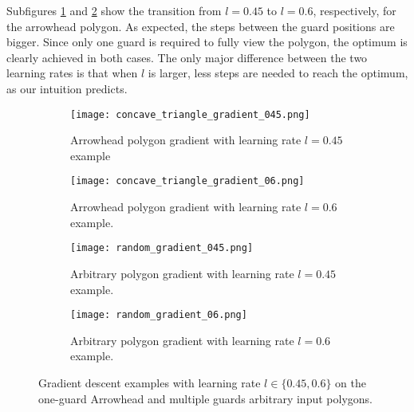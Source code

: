 Subfigures \ref{fig:concave_gradient_045} and \ref{fig:concave_gradient_06} show the transition from $l = 0.45$ to $l = 0.6$, respectively, for the arrowhead polygon. As expected, the steps between the guard positions are bigger. Since only one guard is required to fully view the polygon, the optimum is clearly achieved in both cases. The only major difference between the two learning rates is that when $l$ is larger, less steps are needed to reach the optimum, as our intuition predicts.

\begin{figure}[h!]
    \centering
    \begin{subfigure}{0.45\textwidth}
        \centering
        \texttt{[image: concave\_triangle\_gradient\_045.png]}
        \caption{Arrowhead polygon gradient with learning rate $l = 0.45$ example}
        \label{fig:concave_gradient_045}
    \end{subfigure}
    \begin{subfigure}{0.45\textwidth}
        \centering
        \texttt{[image: concave\_triangle\_gradient\_06.png]}
        \caption{Arrowhead polygon gradient with learning rate $l = 0.6$ example.}
        \label{fig:concave_gradient_06}
    \end{subfigure}
    \begin{subfigure}{0.45\textwidth}
        \centering
        \texttt{[image: random\_gradient\_045.png]}
        \caption{Arbitrary polygon gradient with learning rate $l = 0.45$ example.}
        \label{fig:random_gradient_045}
    \end{subfigure}
    \begin{subfigure}{0.45\textwidth}
        \centering
        \texttt{[image: random\_gradient\_06.png]}
        \caption{Arbitrary polygon gradient with learning rate $l = 0.6$ example.}
        \label{fig:random_gradient_06}
    \end{subfigure}
    \caption{Gradient descent examples with learning rate $l \in \{0.45, 0.6\}$ on the one-guard Arrowhead and multiple guards arbitrary input polygons.}
    \label{fig:multiple_gradients}
\end{figure}

